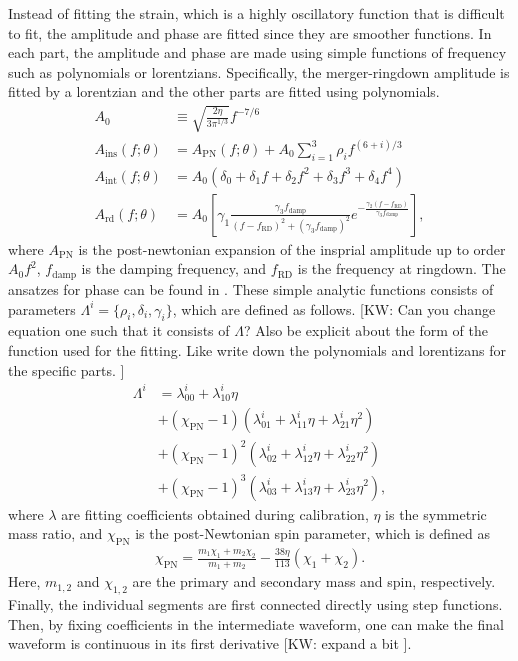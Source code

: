\documentclass[twocolumn]{aastex631}
\newcommand{\kw}[1]{{\color{rb4}[KW: #1 ]}}
\begin{document}
Instead of fitting the strain, which is a highly oscillatory function that is
difficult to fit, the amplitude and phase are fitted since they are smoother
functions. In each part, the amplitude and phase are made using simple functions
of frequency such as polynomials or lorentzians. Specifically, the merger-ringdown amplitude is fitted by a lorentzian and the other parts are fitted using polynomials. 
\begin{equation}\label{eq:amplitude}
\begin{aligned}
	A_0&\equiv\sqrt{\frac{2\eta}{3\pi^{1/3}}}f^{-7/6}\\
	A_{\mathrm{ins}}(f;\theta)&=A_{\mathrm{PN}}(f;\theta)+A_0\sum_{i=1}^3\rho_if^{(6+i)/3} \\
	A_{\mathrm{int}}(f;\theta)&=A_0(\delta_0+\delta_1f+\delta_2f^2+\delta_3f^3+\delta_4f^4) \\
	A_{\mathrm{rd}}(f;\theta)&=A_0\left[\gamma_1\frac{\gamma_3f_{\mathrm{damp}}}{(f-f_{\mathrm{RD}})^2+(\gamma_3f_{\mathrm{damp}})^2}e^{-\frac{\gamma_2(f-f_{\mathrm{RD}})}{\gamma_3f_{\mathrm{damp}}}}\right],  
\end{aligned}
\end{equation}
where $A_{\mathrm{PN}}$ is the post-newtonian expansion of the insprial amplitude up to order $A_0f^2$, $f_{\mathrm{damp}}$ is the damping frequency, and $f_{\mathrm{RD}}$ is the frequency at ringdown. The ansatzes for phase can be found in \citep{khan2016frequency}. These simple analytic functions
consists of parameters $\Lambda^i=\{\rho_i,\delta_i,\gamma_i\}$, which are defined as follows. \kw{Can you
change equation one such that it consists of $\Lambda$? Also be explicit about
the form of the function used for the fitting. Like write down the polynomials
and lorentizans for the specific parts.}
\begin{align} \label{eq:Lambda}
	\Lambda^i&=\lambda_{00}^i+\lambda_{10}^i\eta \nonumber \\
	&+(\chi_{\mathrm{PN}}-1)(\lambda_{01}^i+\lambda_{11}^i\eta+\lambda_{21}^i\eta^2) \nonumber \\ 
	&+(\chi_{\mathrm{PN}}-1)^2(\lambda_{02}^i+\lambda_{12}^i\eta+\lambda_{22}^i\eta^2) \nonumber \\
	&+(\chi_{\mathrm{PN}}-1)^3(\lambda_{03}^i+\lambda_{13}^i\eta+\lambda_{23}^i\eta^2),
\end{align}
where $\lambda$ are fitting coefficients obtained during calibration, $\eta$ is
the symmetric mass ratio, and $\chi_{\mathrm{PN}}$ is the post-Newtonian spin
parameter, which is defined as 
\begin{align}
	\chi_{\mathrm{PN}}=\frac{m_1\chi_1+m_2\chi_2}{m_1+m_2}-\frac{38\eta}{113}(\chi_1+\chi_2).
\end{align}
Here, $m_{1,2}$ and $\chi_{1,2}$ are the primary and secondary mass and spin,
respectively. Finally, the individual segments are first connected directly using 
step functions. Then, by fixing coefficients in the intermediate waveform, one can make 
the final waveform is continuous in its first derivative \kw{expand a bit}.
\end{document}
